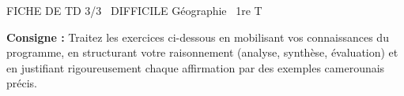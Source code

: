 \documentclass[11pt]{article}
\begin{document}
\begin{tcolorbox}[enhanced,colback=popink,colframe=popink,arc=10pt,boxrule=0pt,left=12pt,right=12pt,top=9pt,bottom=9pt]
{\color{white}\popxbold\small FICHE DE TD 3/3 \textbullet\ DIFFICILE \hfill Géographie \textbullet\ 1re T\par}
\end{tcolorbox}
\vspace{4pt}
\noindent\textbf{Consigne :} Traitez les exercices ci-dessous en mobilisant vos connaissances du programme, en structurant votre raisonnement (analyse, synthèse, évaluation) et en justifiant rigoureusement chaque affirmation par des exemples camerounais précis.
\end{document}
